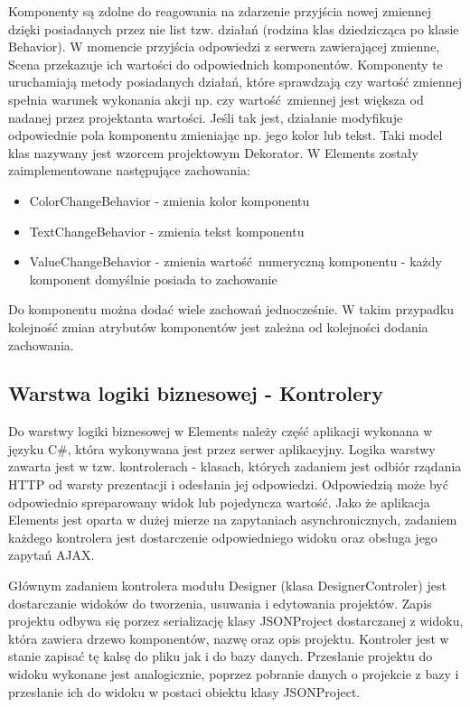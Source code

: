Komponenty są zdolne do reagowania na zdarzenie przyjścia nowej zmiennej dzięki posiadanych przez nie list tzw. działań (rodzina klas dziedzicząca po klasie Behavior). W momencie przyjścia odpowiedzi z serwera zawierającej zmienne, Scena przekazuje ich wartości do odpowiednich komponentów. Komponenty te uruchamiają metody posiadanych działań, które sprawdzają czy wartość zmiennej spełnia warunek wykonania akcji np. czy wartość zmiennej jest większa od nadanej przez projektanta wartości. Jeśli tak jest, działanie modyfikuje odpowiednie pola komponentu zmieniając np. jego kolor lub tekst. Taki model klas nazywany jest wzorcem projektowym Dekorator. 
W Elements zostały zaimplementowane następujące zachowania:
\begin{itemize}
\item ColorChangeBehavior - zmienia kolor komponentu
\item TextChangeBehavior - zmienia tekst komponentu
\item ValueChangeBehavior - zmienia wartość numeryczną komponentu - każdy komponent domyślnie posiada to zachowanie
\end{itemize}
Do komponentu można dodać wiele zachowań jednocześnie. W takim przypadku kolejność zmian atrybutów komponentów jest zależna od kolejności dodania zachowania.

\subsection{Warstwa logiki biznesowej - Kontrolery}
Do warstwy logiki biznesowej w Elements należy część aplikacji wykonana w języku C\#, która wykonywana jest przez serwer aplikacyjny. Logika warstwy zawarta jest w tzw. kontrolerach - klasach, których zadaniem jest odbiór rządania HTTP od warsty prezentacji i odesłania jej odpowiedzi. Odpowiedzią może być odpowiednio spreparowany widok lub pojedyncza wartość. Jako że aplikacja Elements jest oparta w dużej mierze na zapytaniach asynchronicznych, zadaniem każdego kontrolera jest dostarczenie odpowiedniego widoku oraz obsługa jego zapytań AJAX.

Głównym zadaniem kontrolera modułu Designer (klasa DesignerControler) jest dostarczanie widoków do tworzenia, usuwania i edytowania projektów. Zapis projektu odbywa się porzez serializację klasy JSONProject dostarczanej z widoku, która zawiera drzewo komponentów, nazwę oraz opis projektu. Kontroler jest w stanie zapisać tę kalsę do pliku jak i do bazy danych. Przesłanie projektu do widoku wykonane jest analogicznie, poprzez pobranie danych o projekcie z bazy i przesłanie ich do widoku w postaci obiektu klasy JSONProject. 

